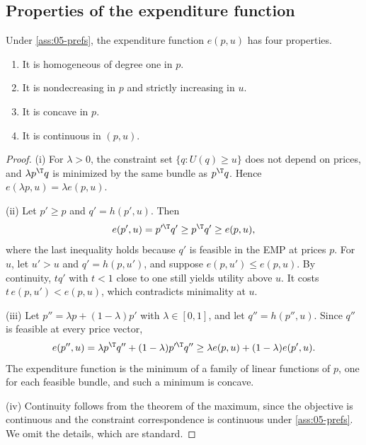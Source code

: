 \subsection{Properties of the expenditure function}\label{sec:05-e-properties}

\begin{proposition}\label{prop:05-e-properties}
Under \cref{ass:05-prefs}, the expenditure function $e(p, u)$ has four properties.
\begin{enumerate}[label=(\roman*)]
\item It is homogeneous of degree one in $p$.
\item It is nondecreasing in $p$ and strictly increasing in $u$.
\item It is concave in $p$.
\item It is continuous in $(p, u)$.
\end{enumerate}
\end{proposition}

\begin{proof}
(i) For $\lambda > 0$, the constraint set $\{q : U(q) \geq u\}$ does not depend on prices, and
$\lambda p^\T q$ is minimized by the same bundle as $p^\T q$. Hence $e(\lambda p, u) = \lambda e(p, u)$.

(ii) Let $p' \geq p$ and $q' = h(p', u)$. Then
\begin{equation*}
e(p', u) = p'^\T q' \geq p^\T q' \geq e(p, u),
\end{equation*}
where the last inequality holds because $q'$ is feasible in the EMP at prices $p$. For $u$, let $u' > u$
and $q' = h(p, u')$, and suppose $e(p, u') \leq e(p, u)$. By continuity, $tq'$ with $t < 1$ close to one
still yields utility above $u$. It costs $t\,e(p, u') < e(p, u)$, which contradicts minimality at $u$.

(iii) Let $p'' = \lambda p + (1 - \lambda)p'$ with $\lambda \in [0, 1]$, and let $q'' = h(p'', u)$. Since
$q''$ is feasible at every price vector,
\begin{equation*}
e(p'', u) = \lambda p^\T q'' + (1 - \lambda)p'^\T q'' \geq \lambda e(p, u) + (1 - \lambda)e(p', u).
\end{equation*}
The expenditure function is the minimum of a family of linear functions of $p$, one for each feasible bundle,
and such a minimum is concave.

(iv) Continuity follows from the theorem of the maximum, since the objective is continuous and the
constraint correspondence is continuous under \cref{ass:05-prefs}. We omit the details, which are standard.
\end{proof}

